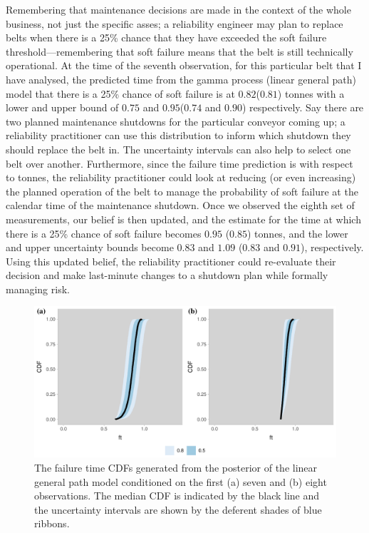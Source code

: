 Remembering that maintenance decisions are made in the context of the whole business, not just the specific asses; a reliability engineer may plan to replace belts when there is a 25\% chance that they have exceeded the soft failure threshold---remembering that soft failure means that the belt is still technically operational. At the time of the seventh observation, for this particular belt that I have analysed, the predicted time from the gamma process (linear general path) model that there is a 25\% chance of soft failure is at $0.82$($0.81$) tonnes with a lower and upper bound of $0.75$ and $0.95$($0.74$ and $0.90$) respectively. Say there are two planned maintenance shutdowns for the particular conveyor coming up; a reliability practitioner can use this distribution to inform which shutdown they should replace the belt in. The uncertainty intervals can also help to select one belt over another. Furthermore, since the failure time prediction is with respect to tonnes, the reliability practitioner could look at reducing (or even increasing) the planned operation of the belt to manage the probability of soft failure at the calendar time of the maintenance shutdown. Once we observed the eighth set of measurements, our belief is then updated, and the estimate for the time at which there is a 25\% chance of soft failure becomes $0.95$ ($0.85$) tonnes, and the lower and upper uncertainty bounds become $0.83$ and $1.09$ ($0.83$ and $0.91$), respectively. Using this updated belief, the reliability practitioner could re-evaluate their decision and make last-minute changes to a shutdown plan while formally managing risk.

\begin{figure}
  \centering
  \includegraphics[width=\textwidth]{figures/ch-6/belt_wear_failuretime_CDF_lm.pdf}
  \caption{The failure time CDFs generated from the posterior of the linear general path model conditioned on the first (a) seven and (b) eight observations. The median CDF is indicated by the black line and the uncertainty intervals are shown by the deferent shades of blue ribbons.}
  \label{fig:beltwear-ft-lm}
\end{figure}

